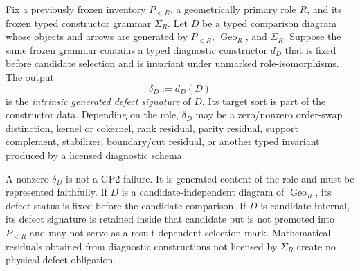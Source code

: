\documentclass[12pt,a4paper]{article}
\begin{document}
\begin{definition}
\label{p2:def:intrinsic-generated-defect}
Fix a previously frozen inventory \(P_{<R}\), a geometrically primary role
\(R\), and its frozen typed constructor grammar \(\Sigma_R\).  Let \(D\) be a
typed comparison diagram whose objects and arrows are generated by
\(P_{<R}\), \(\operatorname{Geo}_R\), and \(\Sigma_R\).  Suppose the same
frozen grammar contains a typed diagnostic constructor \(d_D\) that is fixed
before candidate selection and is invariant under unmarked role-isomorphisms.
The output
\[
  \delta_D:=d_D(D)
\]
is the \emph{intrinsic generated defect signature} of \(D\).  Its target sort
is part of the constructor data.  Depending on the role, \(\delta_D\) may be a
zero/nonzero order-swap distinction, kernel or cokernel, rank residual, parity
residual, support complement, stabilizer, boundary/cut residual, or another
typed invariant produced by a licensed diagnostic schema.

A nonzero \(\delta_D\) is not a GP2 failure.  It is generated content of the
role and must be represented faithfully.  If \(D\) is a candidate-independent
diagram of \(\operatorname{Geo}_R\), its defect status is fixed before the
candidate comparison.  If \(D\) is candidate-internal, its defect signature is
retained inside that candidate but is not promoted into \(P_{<R}\) and may not
serve as a result-dependent selection mark.  Mathematical residuals obtained
from diagnostic constructions not licensed by \(\Sigma_R\) create no physical
defect obligation.
\end{definition}
\end{document}

